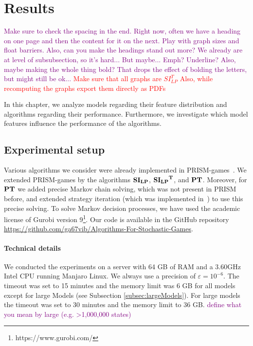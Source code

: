 \chapter{Results} \label{ch:results}

\textcolor{purple}{Make sure to check the spacing in the end. Right now, often we have a heading on one page and then the content for it on the next. Play with graph sizes and float barriers. Also, can you make the headings stand out more? We already are at level of subsubsection, so it's hard... But maybe... Emph? Underline? Also, maybe making the whole thing bold? That drops the effect of bolding the letters, but might still be ok...}
\textcolor{red}{Make sure that all graphs are $SI_{LP}^T$}
\textcolor{red}{Also, while recomputing the graphs export them directly as PDFs}

In this chapter, we analyze models regarding their feature distribution and algorithms regarding their performance.
Furthermore, we investigate which model features influence the performance of the algorithms.



\section{Experimental setup}
Various algorithms we consider were already implemented in PRISM-games~\cite{prismgames3}.
We extended PRISM-games by the algorithms $\mathbf{SI_{LP}}$, $\mathbf{\mathbf{SI_{LP}}^T}$, and $\mathbf{PT}$.
Moreover, for $\mathbf{PT}$ we added precise Markov chain solving, which was not present in PRISM before, and extended strategy iteration (which was implemented in~\cite{gandalf}) to use this precise solving.
To solve Markov decision processes, we have used the academic license of Gurobi version 9\footnote{https://www.gurobi.com/}. 
Our code is available in the GitHub repository \url{https://github.com/ga67vib/Algorithms-For-Stochastic-Games}.

\subsubsection*{Technical details}
We conducted the experiments on a server with 64 GB of RAM and a 3.60GHz Intel CPU running Manjaro Linux. %
We always use a precision of $\varepsilon=10^{-6}$. 
The timeout was set to 15 minutes and the memory limit was 6 GB for all models except for large Models (see Subsection \ref{subsec:largeModels}).
For large models the timeout was set to 30 minutes and the memory limit to 36 GB. \textcolor{purple}{define what you mean by large (e.g. >1,000,000 states)}


